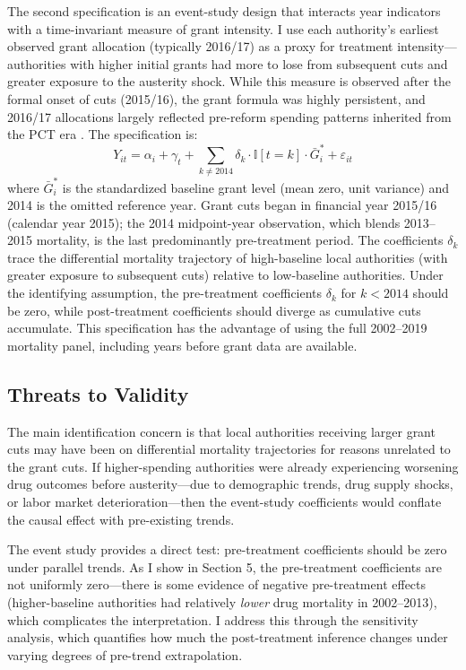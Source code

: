 \documentclass[12pt]{article}
\newcommand{\ind}{\mathbb{I}}
\begin{document}
The second specification is an event-study design that interacts year indicators with a time-invariant measure of grant intensity. I use each authority's earliest observed grant allocation (typically 2016/17) as a proxy for treatment intensity---authorities with higher initial grants had more to lose from subsequent cuts and greater exposure to the austerity shock. While this measure is observed after the formal onset of cuts (2015/16), the grant formula was highly persistent, and 2016/17 allocations largely reflected pre-reform spending patterns inherited from the PCT era \citep{kingsfund2014}. The specification is:
\begin{equation}
Y_{it} = \alpha_i + \gamma_t + \sum_{k \neq 2014} \delta_k \cdot \ind[t = k] \cdot \bar{G}_i^{*} + \varepsilon_{it}
\label{eq:eventstudy}
\end{equation}
where $\bar{G}_i^{*}$ is the standardized baseline grant level (mean zero, unit variance) and 2014 is the omitted reference year. Grant cuts began in financial year 2015/16 (calendar year 2015); the 2014 midpoint-year observation, which blends 2013--2015 mortality, is the last predominantly pre-treatment period. The coefficients $\delta_k$ trace the differential mortality trajectory of high-baseline local authorities (with greater exposure to subsequent cuts) relative to low-baseline authorities. Under the identifying assumption, the pre-treatment coefficients $\delta_k$ for $k < 2014$ should be zero, while post-treatment coefficients should diverge as cumulative cuts accumulate. This specification has the advantage of using the full 2002--2019 mortality panel, including years before grant data are available.

\subsection{Threats to Validity}

The main identification concern is that local authorities receiving larger grant cuts may have been on differential mortality trajectories for reasons unrelated to the grant cuts. If higher-spending authorities were already experiencing worsening drug outcomes before austerity---due to demographic trends, drug supply shocks, or labor market deterioration---then the event-study coefficients would conflate the causal effect with pre-existing trends.

The event study provides a direct test: pre-treatment coefficients should be zero under parallel trends. As I show in Section 5, the pre-treatment coefficients are not uniformly zero---there is some evidence of negative pre-treatment effects (higher-baseline authorities had relatively \textit{lower} drug mortality in 2002--2013), which complicates the interpretation. I address this through the \citet{rambachan2023} sensitivity analysis, which quantifies how much the post-treatment inference changes under varying degrees of pre-trend extrapolation.
\end{document}
